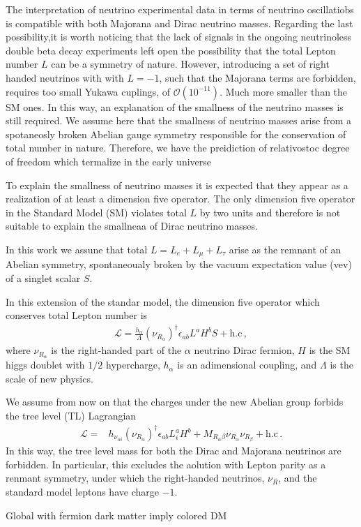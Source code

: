 The interpretation of neutrino experimental data in terms of neutrino oscillatiobs  is compatible with both Majorana and Dirac neutrino masses. Regarding the last possibility,it is worth noticing that the lack of signals in the ongoing neutrinoless double beta decay experiments left  open the possibility that the total Lepton number $L$ can be a symmetry of nature. However, introducing a set of right handed neutrinos with with $L=-1$,
such that the Majorana terms are forbidden, requires too small Yukawa cuplings, of $\mathcal{O}(10^{-11})$. Much more smaller than the SM ones. In this way, an explanation of the smallness of the neutrino masses is still required. We assume here that the smallness of neutrino masses arise from a spotaneosly broken Abelian gauge symmetry responsible for the conservation of total number in nature. Therefore, we have the preidiction of relativostoc degree of freedom which termalize in the early universe

To explain the smallness of neutrino masses it is expected that they appear as a realization of at least a  dimension five operator. The only dimension five operator in the Standard Model (SM) violates total $L$  by two units and therefore is not suitable to explain the smallneaa of Dirac neutrino masses.

In this work we assune that total $L=L_e+L_\mu+L_\tau$ arise as the remnant of an Abelian symmetry, spontaneoualy broken by the vacuum expectation value (vev) of a singlet scalar $S$. %

In this extension of the standar model, the dimension five operator which conserves total Lepton number is~\cite{}
\begin{align}
  \mathcal{L}=
  \frac{h_{\alpha}}{\Lambda} (\nu_{R_\alpha})^\dagger \epsilon_{ab}L^a H^b S + \text{h.c}\,,
\end{align}
where $\nu_{R_\alpha}$ is the right-handed part of  the $\alpha$ neutrino Dirac fermion, $H$ is the SM higgs doublet with $1/2$ hypercharge,
$h_{\alpha}$ is an adimensional coupling, and $\Lambda$ is the scale of new physics.

We assume from now on that the charges under the new Abelian group forbids the tree level (TL) Lagrangian
\begin{align}
 \mathcal{L}= & h_{\nu_{\alpha i}}(\nu_{R_\alpha})^\dagger \epsilon_{ab}L^a_i H^b+M_{R_\alpha\beta}
  \nu_{R_\alpha} \nu_{R_\beta}+
  \text{h.c}\,.
\end{align}
In this way,  the tree level mass for both the Dirac and Majorana neutrinos are forbidden. In particular, this excludes the aolution with Lepton parity as a renmant symmetry, under which the right-handed neutrinos, $\nu_R$, and the standard model leptons have charge $-1$.



Global with fermion dark matter imply colored DM
